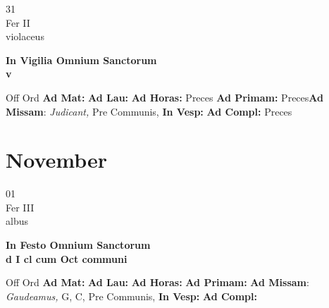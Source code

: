 \documentclass[10pt, openany]{book}
\begin{document}
        \begin{center}
            \begin{minipage}{3.5in}
                \vspace{2em}
                \begin{minipage}{0.5in}
                    {\Huge 31} \\
                    {\normalsize Fer II} \\
                    {\normalsize violaceus}
                \end{minipage}
                \begin{minipage}{3.0in}
                    \textbf{ \large In Vigilia Omnium Sanctorum \\
                    \textnormal{\normalsize v}} \\ 
                \end{minipage}
                \begin{justify}Off Ord
                    \textbf{Ad Mat: }
                    \textbf{Ad Lau: }
                    \textbf{Ad Horas: }Preces
                    \textbf{Ad Primam: }Preces\textbf{Ad Missam}: \textit{Judicant,} Pre Communis,  
                    \textbf{In Vesp: }
                    \textbf{Ad Compl: }Preces
                \end{justify}
            \end{minipage}
        \end{center}
    
        \chapter{November}
                        
        \begin{center}
            \begin{minipage}{3.5in}
                \vspace{2em}
                \begin{minipage}{0.5in}
                    {\Huge 01} \\
                    {\normalsize Fer III} \\
                    {\normalsize albus}
                \end{minipage}
                \begin{minipage}{3.0in}
                    \textbf{ \large In Festo Omnium Sanctorum \\
                    \textnormal{\normalsize d I cl cum Oct communi}} \\ 
                \end{minipage}
                \begin{justify}Off Ord
                    \textbf{Ad Mat: }
                    \textbf{Ad Lau: }
                    \textbf{Ad Horas: }
                    \textbf{Ad Primam: }\textbf{Ad Missam}: \textit{Gaudeamus,} G, C, Pre Communis,  
                    \textbf{In Vesp: }
                    \textbf{Ad Compl: }
                \end{justify}
            \end{minipage}
        \end{center}
    
\end{document}
